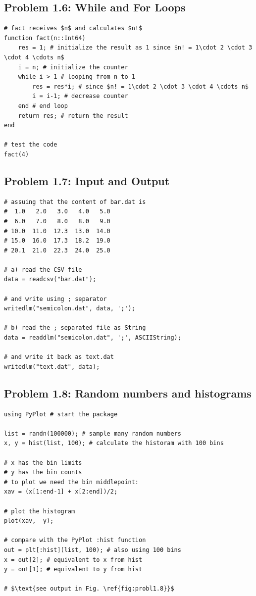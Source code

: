 \subsection*{Problem 1.6: While and For Loops}

\begin{verbatim}
# fact receives $n$ and calculates $n!$
function fact(n::Int64)
    res = 1; # initialize the result as 1 since $n! = 1\cdot 2 \cdot 3 \cdot 4 \cdots n$
    i = n; # initialize the counter
    while i > 1 # looping from n to 1
        res = res*i; # since $n! = 1\cdot 2 \cdot 3 \cdot 4 \cdots n$
        i = i-1; # decrease counter
    end # end loop
    return res; # return the result
end

# test the code
fact(4)
\end{verbatim}


\subsection*{Problem 1.7: Input and Output}

\begin{verbatim}
# assuing that the content of bar.dat is
#  1.0   2.0   3.0   4.0   5.0
#  6.0   7.0   8.0   8.0   9.0
# 10.0  11.0  12.3  13.0  14.0
# 15.0  16.0  17.3  18.2  19.0
# 20.1  21.0  22.3  24.0  25.0

# a) read the CSV file
data = readcsv("bar.dat");

# and write using ; separator
writedlm("semicolon.dat", data, ';');

# b) read the ; separated file as String
data = readdlm("semicolon.dat", ';', ASCIIString);

# and write it back as text.dat
writedlm("text.dat", data);
\end{verbatim}


\subsection*{Problem 1.8:  Random numbers and histograms}

\begin{verbatim}
using PyPlot # start the package

list = randn(100000); # sample many random numbers
x, y = hist(list, 100); # calculate the historam with 100 bins

# x has the bin limits
# y has the bin counts
# to plot we need the bin middlepoint:
xav = (x[1:end-1] + x[2:end])/2;

# plot the histogram
plot(xav,  y);

# compare with the PyPlot :hist function
out = plt[:hist](list, 100); # also using 100 bins
x = out[2]; # equivalent to x from hist
y = out[1]; # equivalent to y from hist

# $\text{see output in Fig. \ref{fig:probl1.8}}$
\end{verbatim}

